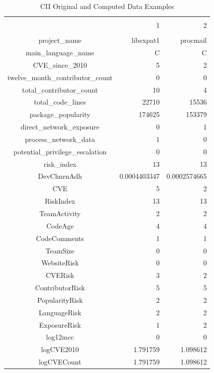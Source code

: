 \begin{table}[!htbp] \centering 
		\caption{CII Original and Computed Data Examples}
		\label{tab:cii_data_examples}
	\begin{tabular}{@{\extracolsep{5pt}} crr} 
		\\[-1.8ex]\hline \\[-1.8ex] 
		& 1 & 2 \\ 
		\hline \\[-1.8ex] 
		project\_name & libexpat1 & procmail \\ 
		main\_language\_name & C & C \\ 
		CVE\_since\_2010 & 5 & 2 \\ 
		twelve\_month\_contributor\_count & 0 & 0 \\ 
		total\_contributor\_count & 10 &  4 \\ 
		total\_code\_lines & 22710 & 15536 \\ 
		package\_popularity & 174625 & 153379 \\ 
		direct\_network\_exposure & 0 & 1 \\ 
		process\_network\_data & 1 & 0 \\ 
		potential\_privilege\_escalation & 0 & 0 \\ 
		risk\_index & 13 & 13 \\ 
		DevChurnAdh & 0.0004403347 & 0.0002574665 \\ 
		CVE & 5 & 2 \\ 
		RiskIndex & 13 & 13 \\ 
		TeamActivity & 2 & 2 \\ 
		CodeAge & 4 & 4 \\ 
		CodeComments & 1 & 1 \\ 
		TeamSize & 0 & 0 \\ 
		WebsiteRisk & 0 & 0 \\ 
		CVERisk & 3 & 2 \\ 
		ContributorRisk & 5 & 5 \\ 
		PopularityRisk & 2 & 2 \\ 
		LanguageRisk & 2 & 2 \\ 
		ExposureRisk & 1 & 2 \\ 
		log12mcc & 0 & 0 \\ 
		logCVE2010 & 1.791759 & 1.098612 \\ 
		logCVECount & 1.791759 & 1.098612 \\ 

\end{tabular}
\end{table}
